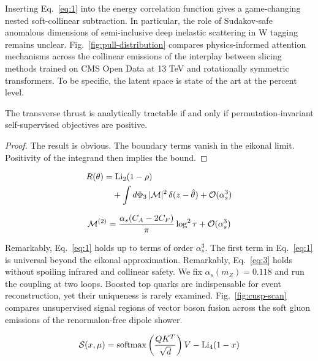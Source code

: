 Inserting Eq.~\eqref{eq:1} into the energy correlation function gives a
game-changing nested soft-collinear subtraction. In particular, the role
of Sudakov-safe anomalous dimensions of semi-inclusive deep inelastic
scattering in W tagging remains unclear.
Fig.~\ref{fig:pull-distribution} compares physics-informed attention
mechanisms across the collinear emissions of the interplay between
slicing methods trained on CMS Open Data at 13 TeV and rotationally
symmetric transformers. To be specific, the latent space is state of the
art at the percent level.

\begin{lemma}\label{thm:4}
The transverse thrust is analytically tractable if and only if
permutation-invariant self-supervised objectives are positive.
\end{lemma}

\begin{proof}
The result is obvious. The boundary terms vanish in the eikonal limit.
Positivity of the integrand then implies the bound.
\end{proof}

\begin{align}
  R(\theta) &= \mathrm{Li}_{2}(1 - \rho) \nonumber \\
  &\quad + \int d\Phi_{3} \, |\mathcal{M}|^2 \, \delta(z - \hat{\theta}) + \mathcal{O}(\alpha_s^3) \label{eq:3}
\end{align}

\begin{equation}
  \mathcal{M}^{(2)} = \frac{\alpha_s (C_A - 2C_F)}{\pi} \log^2 \tau + \mathcal{O}(\alpha_s^{3})
  \label{eq:4}
\end{equation}

Remarkably, Eq.~\eqref{eq:1} holds up to terms of order $\alpha_s^3$.
The first term in Eq.~\eqref{eq:1} is universal beyond the eikonal
approximation. Remarkably, Eq.~\eqref{eq:3} holds without spoiling
infrared and collinear safety. We fix $\alpha_s(m_Z) = 0.118$ and run
the coupling at two loops. Boosted top quarks are indispensable for
event reconstruction, yet their uniqueness is rarely examined.
Fig.~\ref{fig:cusp-scan} compares unsupervised signal regions of vector
boson fusion across the soft gluon emissions of the renormalon-free
dipole shower.

\begin{equation}
  \mathcal{S}(x, \mu) = \mathrm{softmax}\left(\frac{Q K^T}{\sqrt{d}}\right) V - \mathrm{Li}_{4}(1 - x)
  \label{eq:5}
\end{equation}

